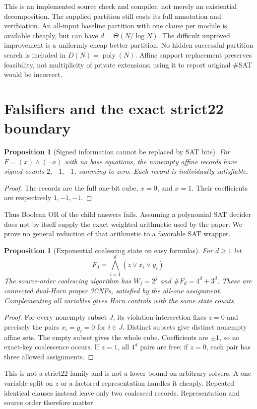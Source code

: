 \documentclass[11pt]{article}
\newtheorem{proposition}[theorem]{Proposition}
\begin{document}
This is an implemented source check and compiler, not merely an existential
decomposition. The supplied partition still costs its full annotation and
verification. An all-input baseline partition with one clause per module is
available cheaply, but can have $d=\Theta(N/\log N)$.
The difficult unproved improvement is a uniformly cheap better partition.
No hidden successful partition search is included in $D(N)=\operatorname{poly}(N)$.
Affine support replacement preserves feasibility, not multiplicity of
private extensions; using it to report original \#SAT would be incorrect.

\section{Falsifiers and the exact strict22 boundary}
\begin{proposition}[Signed information cannot be replaced by SAT bits]
For $F=(x)\land(\neg x)$ with no base equations, the nonempty affine records
have signed counts $2,-1,-1$, summing to zero. Each record is individually
satisfiable.
\end{proposition}
\begin{proof}
The records are the full one-bit cube, $x=0$, and $x=1$.
Their coefficients are respectively $1,-1,-1$.
\end{proof}
Thus Boolean OR of the child answers fails. Assuming a polynomial SAT decider
does not by itself supply the exact weighted arithmetic used by the paper.
We prove no general reduction of that arithmetic to a favorable SAT wrapper.

\begin{proposition}[Exponential coalescing state on easy formulas]
For $d\ge1$ let
\[
 F_d=\bigwedge_{i=1}^d(z\vee x_i\vee y_i).
\]
The source-order coalescing algorithm has $W_j=2^j$ and
$\#F_d=4^d+3^d$. These are connected dual-Horn proper 3CNFs, satisfied
by the all-one assignment. Complementing all variables gives Horn controls
with the same state counts.
\end{proposition}
\begin{proof}
For every nonempty subset $J$, its violation intersection fixes $z=0$ and
precisely the pairs $x_i=y_i=0$ for $i\in J$. Distinct subsets give distinct
nonempty affine sets. The empty subset gives the whole cube. Coefficients
are $\pm1$, so no exact-key coalescence occurs. If $z=1$, all $4^d$ pairs
are free; if $z=0$, each pair has three allowed assignments.
\end{proof}
This is not a strict22 family and is not a lower bound on arbitrary solvers.
A one-variable split on $z$ or a factored representation handles it cheaply.
Repeated identical clauses instead leave only two coalesced records.
Representation and source order therefore matter.
\end{document}
